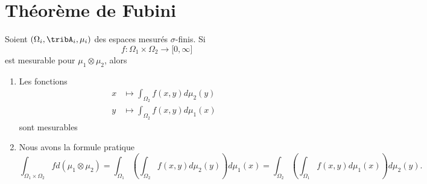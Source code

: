 
\section{Théorème de Fubini}

\begin{theorem}
    Soient \( (\Omega_i,\tribA_i,\mu_i)\) des espaces mesurés $\sigma$-finis. Si
    \begin{equation}
        f\colon \Omega_1\times\Omega_2\to \mathopen[ 0 , \infty \mathclose]
    \end{equation}
    est mesurable pour \( \mu_1\otimes \mu_2\), alors
    \begin{enumerate}
        \item
            Les fonctions
            \begin{subequations}
                \begin{align}
                    x&\mapsto\int_{\Omega_2}f(x,y)d\mu_2(y)\\
                    y&\mapsto\int_{\Omega_2}f(x,y)d\mu_1(x)
                \end{align}
            \end{subequations}
            sont mesurables
        \item
            Nous avons la formule pratique
            \begin{equation}
                \int_{\Omega_1\times\Omega_2}fd(\mu_1\otimes\mu_2)=\int_{\Omega_1}\left( \int_{\Omega_2}f(x,y)d\mu_2(y) \right)d\mu_1(x)
                =\int_{\Omega_2}\left( \int_{\Omega_1}f(x,y)d\mu_1(x) \right)d\mu_2(y).
            \end{equation}
    \end{enumerate}
\end{theorem}

